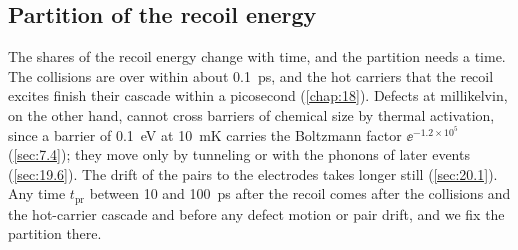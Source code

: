\subsection{Partition of the recoil energy}\label{sec:19.1-partition}

The shares of the recoil energy change with time, and the partition needs a time. The collisions are over within about \SI{0.1}{ps}, and the hot carriers that the recoil excites finish their cascade within a picosecond (\cref{chap:18}). Defects at millikelvin, on the other hand, cannot cross barriers of chemical size by thermal activation, since a barrier of \SI{0.1}{eV} at \SI{10}{mK} carries the Boltzmann factor $\ee^{-1.2\times10^5}$ (\cref{sec:7.4}); they move only by tunneling or with the phonons of later events (\cref{sec:19.6}). The drift of the pairs to the electrodes takes longer still (\cref{sec:20.1}). Any time $t_{\mathrm{pr}}$ between 10 and \SI{100}{ps} after the recoil comes after the collisions and the hot-carrier cascade and before any defect motion or pair drift, and we fix the partition there.

